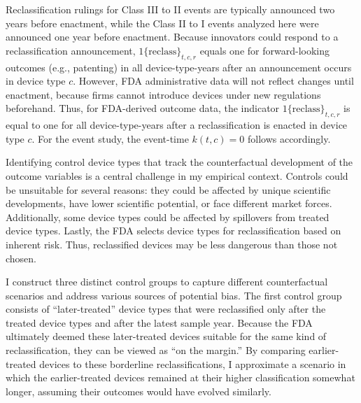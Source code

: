 \documentclass[letterpaper,12pt]{article}
\theoremstyle{definition}
\begin{document}
Reclassification rulings for Class III to II events are typically announced two years before enactment, while the Class II to I events analyzed here were announced one year before enactment. Because innovators could respond to a reclassification announcement, $1\text{\{reclass\}}_{t,c,r}$ equals one for forward-looking outcomes (e.g., patenting) in all device-type-years after an announcement occurs in device type $c$. However, FDA administrative data will not reflect changes until enactment, because firms cannot introduce devices under new regulations beforehand. Thus, for FDA-derived outcome data, the indicator $1\text{\{reclass\}}_{t,c,r}$ is equal to one for all device-type-years after a reclassification is enacted in device type $c$. For the event study, the event-time $k(t,c) = 0$ follows accordingly.


Identifying control device types that track the counterfactual development of the outcome variables is a central challenge in my empirical context. Controls could be unsuitable for several reasons: they could be affected by unique scientific developments, have lower scientific potential, or face different market forces. Additionally, some device types could be affected by spillovers from treated device types. Lastly, the FDA selects device types for reclassification based on inherent risk. Thus, reclassified devices may be less dangerous than those not chosen.

I construct three distinct control groups to capture different counterfactual scenarios and address various sources of potential bias. The first control group consists of “later-treated” device types that were reclassified only after the treated device types and after the latest sample year.\footnotemark {}
Because the FDA ultimately deemed these later-treated devices suitable for the same kind of reclassification, they can be viewed as “on the margin.” By comparing earlier-treated devices to these borderline reclassifications, I approximate a scenario in which the earlier-treated devices remained at their higher classification somewhat longer, assuming their outcomes would have evolved similarly.
\end{document}
